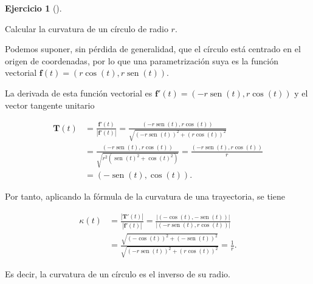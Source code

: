 \documentclass[
  a4paper,
]{scrreport}
\theoremstyle{definition}
\newtheorem{exercise}{Ejercicio}[chapter]
\theoremstyle{remark}
\begin{document}
\begin{exercise}[]\protect\hypertarget{exr-curvatura-circulo}{}\label{exr-curvatura-circulo}

Calcular la curvatura de un círculo de radio \(r\).

\end{exercise}

\begin{tcolorbox}[enhanced jigsaw, coltitle=black, toptitle=1mm, colframe=quarto-callout-tip-color-frame, colbacktitle=quarto-callout-tip-color!10!white, breakable, opacityback=0, bottomtitle=1mm, opacitybacktitle=0.6, title=\textcolor{quarto-callout-tip-color}{\faLightbulb}\hspace{0.5em}{Solución}, arc=.35mm, leftrule=.75mm, toprule=.15mm, titlerule=0mm, bottomrule=.15mm, left=2mm, rightrule=.15mm, colback=white]

Podemos suponer, sin pérdida de generalidad, que el círculo está
centrado en el origen de coordenadas, por lo que una parametrización
suya es la función vectorial
\(\mathbf{f}(t) = (r\cos(t),r\operatorname{sen}(t))\).

La derivada de esta función vectorial es
\(\mathbf{f}'(t)= (-r\operatorname{sen}(t), r\cos(t))\) y el vector
tangente unitario

\begin{align*}
\mathbf{T}(t) 
&= \frac{\mathbf{f}'(t)}{|\mathbf{f}'(t)|}
= \frac{(-r\operatorname{sen}(t), r\cos(t))}{\sqrt{(-r\operatorname{sen}(t))^2 +(r\cos(t))^2}} \\
&= \frac{(-r\operatorname{sen}(t), r\cos(t))}{\sqrt{r^2(\operatorname{sen}(t)^2 +\cos(t)^2)}}
=\frac{(-r\operatorname{sen}(t), r\cos(t))}{r} \\
&= (-\operatorname{sen}(t), \cos(t)).
\end{align*}

Por tanto, aplicando la fórmula de la curvatura de una trayectoria, se
tiene

\begin{align*}
\kappa(t) 
&= \frac{|\mathbf{T}'(t)|}{|\mathbf{f}'(t)|} 
= \frac{|(-\cos(t), -\operatorname{sen}(t))|}{|(-r\operatorname{sen}(t), r\cos(t))|} \\
&= \frac{\sqrt{(-\cos(t))^2+(-\operatorname{sen}(t))^2}}{\sqrt{(-r\operatorname{sen}(t))^2 +(r\cos(t))^2}}
= \frac{1}{r}.
\end{align*}

Es decir, la curvatura de un círculo es el inverso de su radio.

\end{tcolorbox}
\end{document}
